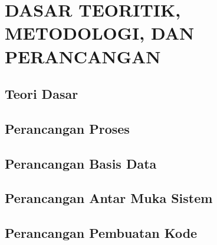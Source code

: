 \chapter{\vspace{2ex}DASAR TEORITIK, METODOLOGI, DAN PERANCANGAN}

\section{Teori Dasar}


\section{Perancangan Proses}


\section{Perancangan Basis Data}


\section{Perancangan Antar Muka Sistem}


\section{Perancangan Pembuatan Kode}
\label{sec:perancangan-pembuatan-kode}
